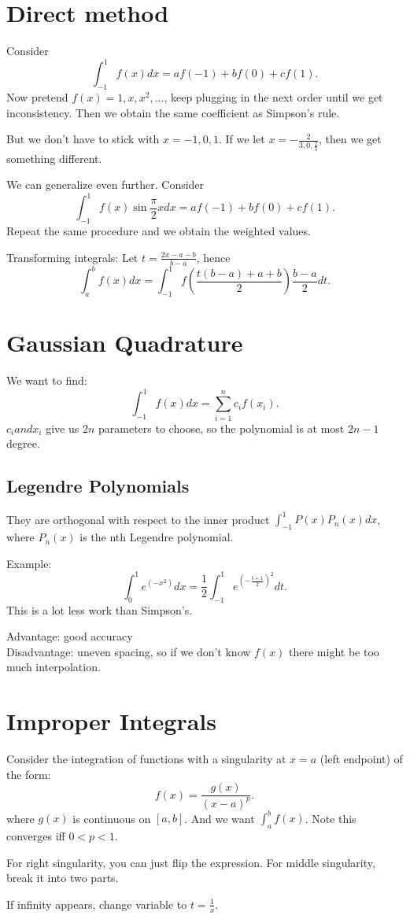 \documentclass[class=article, crop=false]{standalone}
\theoremstyle{plain}
\theoremstyle{remark}
\begin{document}
\section{Direct method}
Consider
\[
	\int_{-1}^1 f(x)dx = a f(-1) +b f(0) +c f(1)   
.\] 
Now pretend $f(x)=1,x,x^2,\ldots$, keep plugging in the next order until we get inconsistency. Then we obtain the same coefficient as Simpson's rule.

But we don't have to stick with $x=-1,0,1$. If we let  $x=-\frac{2}{3,0,\frac{2}{3}}$, then we get something different.

We can generalize even further. Consider
\[
	\int_{-1}^1 f(x) \sin \frac{\pi}{2}x dx =  a f(-1) +b f(0) +c f(1)
.\] 
Repeat the same procedure and we obtain the weighted values.

Transforming integrals:
Let $t = \frac{2x-a-b}{b-a}$, hence
\[
	\int_a^b f(x) dx = \int_{-1}^1 f\left( \frac{t(b-a)+a+b}{2} \right) \frac{b-a}{2} dt 
.\] 

\section{Gaussian Quadrature}
We want to find:
\[
	\int_{-1}^1 f(x)dx = \sum_{i=1}^n c_i f(x_{i}) 
.\] 
$c_i and x_{i}$ give us $2n$ parameters to choose, so the polynomial is at most  $2n-1$ degree.

\subsection{Legendre Polynomials}
They are orthogonal with respect to the inner product $\int_{-1}^1 P(x)P_n(x)dx $, where $P_n(x)$ is the nth Legendre polynomial.

Example:
\[
\int_0^1 e^{(-x^2)}dx = \frac{1}{2}\int_{-1}^1 e^{(-\frac{t+1}{2})^2}dt
.\] 
This is a lot less work than Simpson's.

Advantage: good accuracy\\
Disadvantage: uneven spacing, so if we don't know $f(x)$ there might be too much interpolation.

\section{Improper Integrals}

Consider the integration of functions with a singularity at $x=a$ (left endpoint) of the form:
 \[
	 f(x) = \frac{g(x) }{(x-a)^{p}} 
.\] 
where $g(x) $ is continuous on $[a,b]$. And we want $\int_a^b f(x) $. Note this converges iff $0<p<1$. 

For right singularity, you can just flip the expression. For middle singularity, break it into two parts.

If infinity appears, change variable to $t=\frac{1}{x}$.
\end{document}
